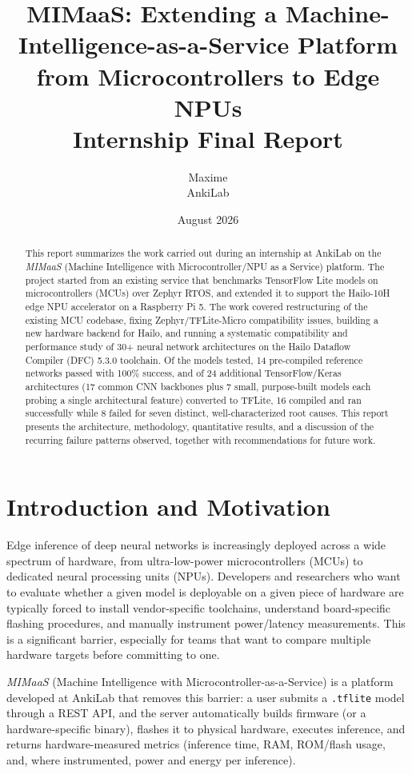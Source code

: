 \documentclass[11pt]{article}
\title{\textbf{MIMaaS: Extending a Machine-Intelligence-as-a-Service Platform\\
from Microcontrollers to Edge NPUs}\\[0.3em]
\large Internship Final Report}
\author{Maxime \\ AnkiLab}
\date{August 2026}
\begin{document}
\maketitle

\begin{abstract}
This report summarizes the work carried out during an internship at AnkiLab on the
\emph{MIMaaS} (Machine Intelligence with Microcontroller/NPU as a Service) platform.
The project started from an existing service that benchmarks TensorFlow Lite models
on microcontrollers (MCUs) over Zephyr RTOS, and extended it to support the
Hailo-10H edge NPU accelerator on a Raspberry Pi 5. The work covered restructuring
of the existing MCU codebase, fixing Zephyr/TFLite-Micro compatibility issues,
building a new hardware backend for Hailo, and running a systematic compatibility
and performance study of 30+ neural network architectures on the Hailo Dataflow
Compiler (DFC) 5.3.0 toolchain. Of the models tested, 14 pre-compiled reference
networks passed with 100\% success, and of 24 additional TensorFlow/Keras
architectures (17 common CNN backbones plus 7 small, purpose-built models each
probing a single architectural feature) converted to TFLite, 16 compiled and
ran successfully while 8 failed for seven distinct, well-characterized root
causes. This report presents the
architecture, methodology, quantitative results, and a discussion of the
recurring failure patterns observed, together with recommendations for future work.
\end{abstract}

\tableofcontents
\newpage

\section{Introduction and Motivation}

Edge inference of deep neural networks is increasingly deployed across a wide
spectrum of hardware, from ultra-low-power microcontrollers (MCUs) to dedicated
neural processing units (NPUs). Developers and researchers who want to evaluate
whether a given model is deployable on a given piece of hardware are typically
forced to install vendor-specific toolchains, understand board-specific
flashing procedures, and manually instrument power/latency measurements. This is
a significant barrier, especially for teams that want to compare multiple
hardware targets before committing to one.

\emph{MIMaaS} (Machine Intelligence with Microcontroller-as-a-Service) is a
platform developed at AnkiLab that removes this barrier: a user submits a
\texttt{.tflite} model through a REST API, and the server automatically builds
firmware (or a hardware-specific binary), flashes it to physical hardware,
executes inference, and returns hardware-measured metrics (inference time, RAM,
ROM/flash usage, and, where instrumented, power and energy per inference).
\end{document}
